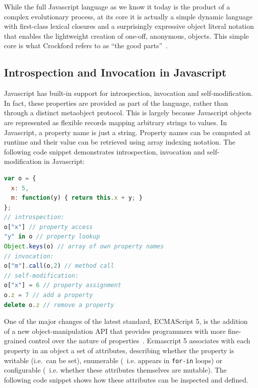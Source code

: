 \documentclass{acm_proc_article-sp}
\begin{document}

While the full Javascript language as we know it today is the product of a complex evolutionary process, at its core it is actually a simple dynamic language with first-class lexical closures and a surprisingly expressive object literal notation that enables the lightweight creation of one-off, anonymous, objects. This simple core is what Crockford refers to as ``the good parts''~\cite{crockford08good}.

\subsection{Introspection and Invocation in Javascript}
\label{sub:introspection_in_js}

Javascript has built-in support for introspection, invocation and self-modification. In fact, these properties are provided as part of the language, rather than through a distinct metaobject protocol. This is largely because Javascript objects are represented as flexible records mapping arbitrary strings to values. In Javascript, a property name is just a string. Property names can be computed at runtime and their value can be retrieved using array indexing notation. The following code snippet demonstrates introspection, invocation and self-modification in Javascript:

\begin{lstlisting}[language=javascript]
var o = {
  x: 5,
  m: function(y) { return this.x + y; }
};
// introspection:
o["x"] // property access
"y" in o // property lookup
Object.keys(o) // array of own property names
// invocation:
o["m"].call(o,2) // method call
// self-modification:
o["x"] = 6 // property assignment
o.z = 7 // add a property
delete o.z // remove a property
\end{lstlisting}

One of the major changes of the latest standard, ECMAScript 5, is the addition of a new object-manipulation API that provides programmers with more fine-grained control over the nature of properties~\cite{ECMA262}. Ecmascript 5 associates with each property in an object a set of attributes, describing whether the property is writable (i.e.~can be set), enumerable (~i.e. appears in \texttt{for-in} loops) or configurable (~i.e. whether these attributes themselves are mutable). The following code snippet shows how these attributes can be inspected and defined.
\end{document}
